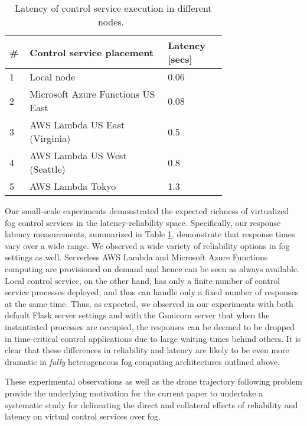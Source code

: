 \documentclass[10pt, journal, letterpaper]{IEEEtran}
\newcommand{\1}{\ensuremath{\mathbf{1}}} %
\begin{document}
\begin{table}[t]
\centering
  \caption{Latency of control service execution in different nodes.~\label{table:ExperimentalLatencies}}
  \vspace{-0.2cm}
 \begin{tabular}{|p{0.03\linewidth}|p{0.5\linewidth} | p{0.2\linewidth} | }
  \hline
  \# & Control service placement & Latency [secs] \\
 \hline
 1 & Local node & 0.06 \\ \hline
 2 & Microsoft Azure Functions US East & 0.08 \\ \hline
 3 & AWS Lambda US East (Virginia) & 0.5 \\  \hline
 4 & AWS Lambda US West (Seattle) & 0.8 \\ \hline
 5 & AWS Lambda Tokyo & 1.3 \\ \hline
 \end{tabular}
\end{table}


\par
Our small-scale experiments demonstrated the expected richness of virtualized fog control services in the latency-reliability space. Specifically, our response latency measurements, summarized in Table \ref{table:ExperimentalLatencies}, demonstrate that response times vary over a wide range. We observed a wide variety of reliability options in fog settings as well. Serverless AWS Lambda and Microsoft Azure Functions computing are provisioned on demand and hence can be seen as always available. %
Local control service, on the other hand, has only a finite number of control service processes deployed, and thus can handle only a fixed number of responses at the same time. Thus, as expected, we observed in our experiments with both default Flask server settings %
and with the Gunicorn server that when the instantiated processes are occupied, the responses can be deemed to be dropped in time-critical control applications due to large waiting times behind others. It is clear that these differences in reliability and latency %
are likely to be even more dramatic in {\em fully} heterogeneous fog computing architectures outlined above.

These experimental observations as well as the drone trajectory following problem provide the underlying motivation for the current paper to undertake a systematic study for delineating the direct and collateral effects of reliability and latency on virtual control services over fog.  %
\end{document}
